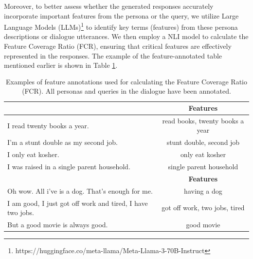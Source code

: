 Moreover, to better assess whether the generated responses accurately incorporate important features from the persona or the query, we utilize Large Language Models (LLMs)\footnote[4]{https://huggingface.co/meta-llama/Meta-Llama-3-70B-Instruct} to identify key terms (features) from these persona descriptions or dialogue utterances. We then employ a NLI model to calculate the Feature Coverage Ratio (FCR), ensuring that critical features are effectively represented in the responses. The example of the feature-annotated table mentioned earlier is shown in Table \ref{table:fcr-feature-annotated-example}.

\begin{table}[H]
\centering
\def\arraystretch{1.2}%
\begin{tabular}{|l|c|}
\hline

\rowcolor[RGB]{204,217,245}
\multicolumn{1}{|c|}{\textbf{Persona description}} & \textbf{Features} \\
\hline

I read twenty books a year. & read books, twenty books a year   \\
\hline

I'm a stunt double as my second job. & stunt double, second job \\
\hline

I only eat kosher. & only eat kosher \\
\hline

I was raised in a single parent household. & single parent household \\
\hline

\rowcolor[RGB]{204,217,245}
\multicolumn{1}{|c|}{\textbf{Utterance}} & \textbf{Features} \\
\hline

Oh wow. All i've is a dog. That's enough for me. & having a dog  \\
\hline

I am good, I just got off work and tired, I have two jobs. & got off work, two jobs, tired \\
\hline

But a good movie is always good. & good movie \\
\hline

\end{tabular}
\caption{Examples of feature annotations used for calculating the Feature Coverage Ratio (FCR). All personas and queries in the dialogue have been annotated.}
\label{table:fcr-feature-annotated-example}
\end{table}

